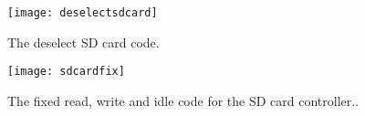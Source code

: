 \begin{figure}
  \centering
  \texttt{[image: deselectsdcard]}
  \caption{The deselect SD card code.}
  \label{fig:deselectsdcard}
\end{figure}

\begin{figure}
  \centering
  \texttt{[image: sdcardfix]}
  \caption{The fixed read, write and idle code for the SD card controller..}
  \label{fig:sdcardfix}
\end{figure}


\section{}

\label{Ch6 Sec3}





